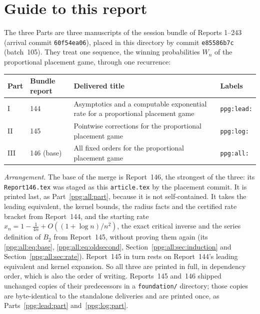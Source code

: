 \documentclass[11pt,letterpaper]{article}
\theoremstyle{remark}\newtheorem{remark}[theorem]{Remark}
\numberwithin{equation}{section}
\newcommand{\file}[1]{\nolinkurl{#1}}
\begin{document}
\section*{Guide to this report}\label{ppg:sec:guide}
The three Parts are three manuscripts of the session bundle of Reports 1--243 (arrival commit \texttt{60f54ea06}), placed in this directory by commit \texttt{e85586b7c} (batch~105). They treat one sequence, the winning probabilities $W_n$ of the proportional placement game, through one recurrence:
\begin{center}
\small
\begin{tabular}{@{}l l >{\raggedright\arraybackslash}p{} l@{}}
\toprule
Part & Bundle report & Delivered title & Labels\\
\midrule
I & 144 & Asymptotics and a computable exponential rate for a proportional placement game & \texttt{ppg:lead:}\\
II & 145 & Pointwise corrections for the proportional placement game & \texttt{ppg:log:}\\
III & 146 (base) & All fixed orders for the proportional placement game & \texttt{ppg:all:}\\
\bottomrule
\end{tabular}
\end{center}
\emph{Arrangement.} The base of the merge is Report~146, the strongest of the three: its \file{Report146.tex} was staged as this \file{article.tex} by the placement commit. It is printed last, as Part~\ref{ppg:all:part}, because it is not self-contained. It takes the leading equivalent, the kernel bounds, the radius facts and the certified rate bracket from Report~144, and the starting rate $x_n=1-\frac1{4n}+O((1+\log n)/n^2)$, the exact critical inverse and the series definition of $B_2$ from Report~145, without proving them again (its \eqref{ppg:all:eq:base}, \eqref{ppg:all:eq:oldsecond}, Section~\ref{ppg:all:sec:induction} and Section~\ref{ppg:all:sec:rate}). Report~145 in turn rests on Report~144's leading equivalent and kernel expansion. So all three are printed in full, in dependency order, which is also the order of writing. Reports~145 and~146 shipped unchanged copies of their predecessors in a \file{foundation/} directory; those copies are byte-identical to the standalone deliveries and are printed once, as Parts~\ref{ppg:lead:part} and~\ref{ppg:log:part}.
\end{document}
